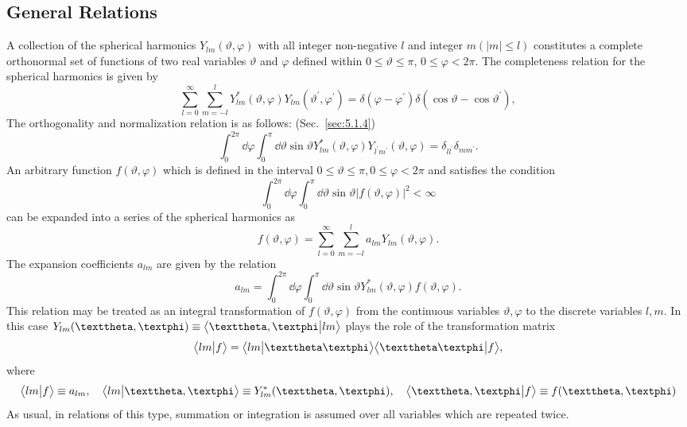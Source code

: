 \subsection{General Relations}\label{sec:5.6.1}
A collection of the spherical harmonics $Y_{l m}(\vartheta, \varphi)$ with all integer non-negative $l$ and integer $m(|m| \leq l)$ constitutes a complete orthonormal set of functions of two real variables $\vartheta$ and $\varphi$ defined within $0 \leq \vartheta \leq \pi$, $0 \leq \varphi<2 \pi$. The completeness relation for the spherical harmonics is given by
\begin{equation}
\sum_{l=0}^{\infty} \sum_{m=-l}^{l} Y_{l m}^{*}(\vartheta, \varphi) Y_{l m}\left(\vartheta^{\prime}, \varphi^{\prime}\right)=\delta\left(\varphi-\varphi^{\prime}\right) \delta\left(\cos \vartheta-\cos \vartheta^{\prime}\right), \label{eq:5:6:1}
\end{equation}
The orthogonality and normalization relation is as follows: (Sec.~\ref{sec:5.1.4})
\begin{equation}
\int_{0}^{2 \pi} \dd \varphi \int_{0}^{\pi} \dd \vartheta \sin \vartheta Y_{l m}^{*}(\vartheta, \varphi) Y_{l^{\prime} m^{\prime}}(\vartheta, \varphi)=\delta_{l l^{\prime}} \delta_{m m^{\prime}}. \label{eq:5:6:2}
\end{equation}
An arbitrary function $f(\vartheta, \varphi)$ which is defined in the interval $0 \leq \vartheta \leq \pi, 0 \leq \varphi<2 \pi$ and satisfies the condition
\begin{equation}
\int_{0}^{2 \pi} \dd \varphi \int_{0}^{\pi} \dd \vartheta \sin \vartheta|f(\vartheta, \varphi)|^{2}<\infty \label{eq:5:6:3}
\end{equation}
can be expanded into a series of the spherical harmonics as
\begin{equation}
f(\vartheta, \varphi)=\sum_{l=0}^{\infty} \sum_{m=-l}^{l} a_{l m} Y_{l m}(\vartheta, \varphi). \label{eq:5:6:4}
\end{equation}
The expansion coefficients $a_{l m}$ are given by the relation
\begin{equation}
a_{l m}=\int_{0}^{2 \pi} \dd \varphi \int_{0}^{\pi} \dd \vartheta \sin \vartheta Y_{l m}^{*}(\vartheta, \varphi) f(\vartheta, \varphi). \label{eq:5:6:5}
\end{equation}
This relation may be treated as an integral transformation of $f(\vartheta, \varphi)$ from the continuous variables $\vartheta, \varphi$ to the discrete variables $l, m$. In this case $Y_{l m}(\vartheta, \varphi) \equiv\braket{\vartheta, \varphi}{l m}$ plays the role of the transformation matrix
\begin{equation}
\braket{l m}{f}=\braket{l m}{\vartheta \varphi}\braket{\vartheta \varphi}{f}, \label{eq:5:6:6}
\end{equation}
where
\[
\braket{l m}{f} \equiv a_{l m}, \quad\braket{l m}{\vartheta, \varphi} \equiv Y_{l m}^{*}(\vartheta, \varphi), \quad\braket{\vartheta, \varphi}{f} \equiv f(\vartheta, \varphi)
\]
As usual, in relations of this type, summation or integration is assumed over all variables which are repeated twice.

